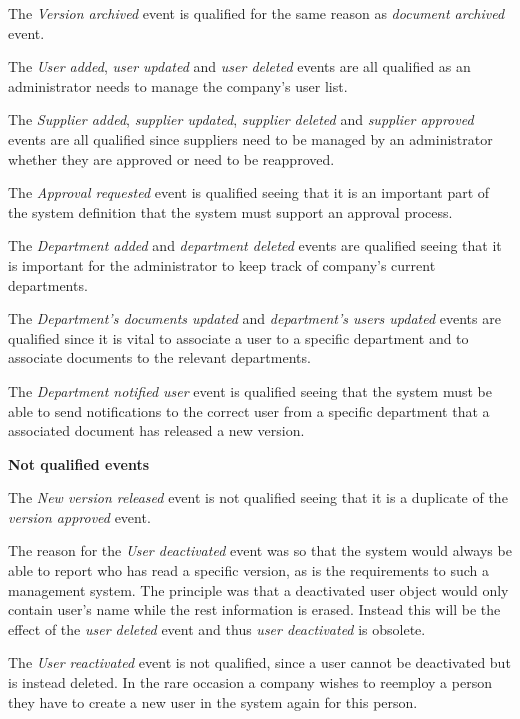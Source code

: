 The \textit{Version archived} event is qualified for the same reason as \textit{document archived} event.

The \textit{User added}, \textit{user updated} and \textit{user deleted} events are all qualified as an administrator needs to manage the company's user list.

The \textit{Supplier added}, \textit{supplier updated},  \textit{supplier deleted} and \textit{supplier approved} events are all qualified since suppliers need to be managed by an administrator whether they are approved or need to be reapproved.

The \textit{Approval requested} event is qualified seeing that it is an important part of the system definition that the system must support an approval process.

The \textit{Department added} and \textit{department deleted} events are qualified seeing that it is important for the administrator to keep track of company's current departments.

The \textit{Department's documents updated} and \textit{department's users updated} events are qualified since it is vital to associate a user to a specific department and to associate documents to the relevant departments.

The \textit{Department notified user} event is qualified seeing that the system must be able to send notifications to the correct user from a specific department that a associated document has released a new version.

\textbf{Not qualified events}

The \textit{New version released} event is not qualified seeing that it is a duplicate of the \textit{version approved} event.

The reason for the \textit{User deactivated} event was so that the system would always be able to report who has read a specific version, as is the requirements to such a management system.
The principle was that a deactivated user object would only contain user's name while the rest information is erased.
Instead this will be the effect of the \textit{user deleted} event and thus \textit{user deactivated} is obsolete.

The \textit{User reactivated} event is not qualified, since a user cannot be deactivated but is instead deleted. In the rare occasion a company wishes to reemploy a person they have to create a new user in the system again for this person.

